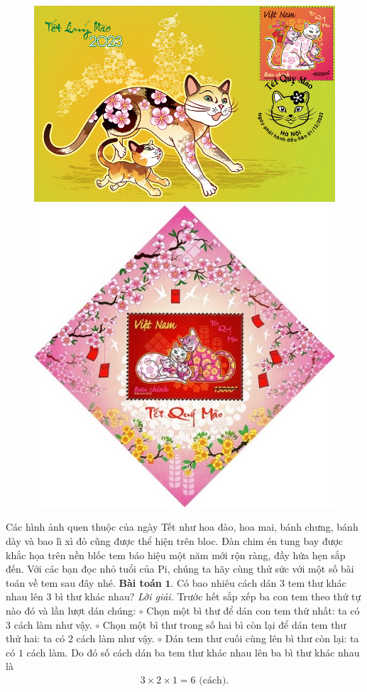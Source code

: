 \begin{multicols}{2}
	\begin{figure}[H]
		\vspace*{-5pt}
		\centering
		\captionsetup{labelformat= empty, justification=centering}
		\includegraphics[height=0.382\linewidth]{tem3}
		\includegraphics[height=0.382\linewidth]{tem4}
		\vspace*{-10pt}
	\end{figure}
	Các hình ảnh quen thuộc của ngày Tết như hoa đào, hoa mai, bánh chưng, bánh dày và bao lì xì đỏ cũng được thể hiện trên bloc. Đàn chim én tung bay được khắc họa trên nền blốc tem báo hiệu một năm mới rộn ràng, đầy hứa hẹn sắp đến. 
	\vskip 0.1cm
	Với các bạn đọc nhỏ tuổi của Pi, chúng ta hãy cùng thử sức với một số bài toán về tem sau đây nhé.
	\vskip 0.1cm
	\textbf{\color{toancuabi}Bài toán} $\pmb{1.}$ Có bao nhiêu cách dán $3$ tem thư khác nhau lên $3$ bì thư khác nhau?
	\vskip 0.1cm
	\textit{Lời giải.} Trước hết sắp xếp ba con tem theo thứ tự nào đó và lần lượt dán chúng:
	\vskip 0.1cm
	$\circ$	Chọn một bì thư để dán con tem thứ nhất: ta có $3$ cách làm như vậy.
	\vskip 0.1cm
	$\circ$	Chọn một bì thư trong số hai bì còn lại để dán tem thư thứ hai: ta có $2$ cách làm như vậy.
	\vskip 0.1cm
	$\circ$	Dán tem thư cuối cùng lên bì thư còn lại: ta  có $1$ cách làm.
	\vskip 0.1cm
	Do đó số cách dán ba tem thư khác nhau lên ba bì thư khác nhau là
	\begin{align*}
		3 \times 2 \times 1= 6 \text{ (cách).}
	\end{align*}

\end{multicols}
